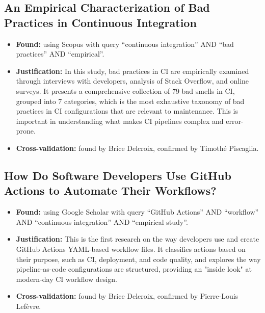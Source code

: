 \documentclass[a4paper,11pt,oneside]{article}
\begin{document}
\subsection{An Empirical Characterization of Bad Practices in Continuous Integration \cite{Zampetti2020}}
%
\begin{itemize}
    \item \textbf{Found:} using Scopus with query ``continuous integration'' AND ``bad practices'' AND ``empirical''.
    \item \textbf{Justification:} In this study, bad practices in CI are empirically examined through interviews with developers, analysis of Stack Overflow, and online surveys. It presents a comprehensive collection of 79 bad smells in CI, grouped into 7 categories, which is the most exhaustive taxonomy of bad practices in CI configurations that are relevant to maintenance. This is important in understanding what makes CI pipelines complex and error-prone.
    \item \textbf{Cross-validation:} found by Brice Delcroix, confirmed by Timoth\'{e} Piscaglia.
\end{itemize}

\subsection{How Do Software Developers Use GitHub Actions to Automate Their Workflows? \cite{Kinsman2021}}
%
\begin{itemize}
    \item \textbf{Found:} using Google Scholar with query ``GitHub Actions'' AND ``workflow'' AND ``continuous integration'' AND ``empirical study''.
    \item \textbf{Justification:} This is the first research on the way developers use and create GitHub Actions YAML-based workflow files. It classifies actions based on their purpose, such as CI, deployment, and code quality, and explores the way pipeline-as-code configurations are structured, providing an "inside look" at modern-day CI workflow design.
    \item \textbf{Cross-validation:} found by Brice Delcroix, confirmed by Pierre-Louis Lef\`{e}vre.
\end{itemize}

\end{document}
